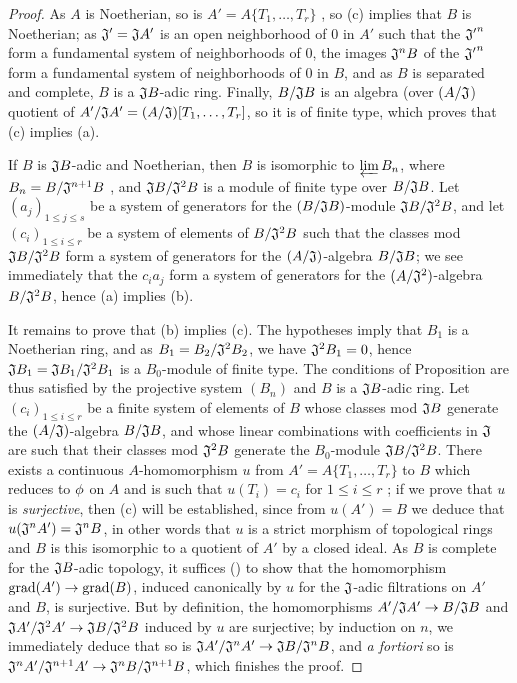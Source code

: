 \begin{proof}
\label{proof-0.7.5.5}
As $A$ is Noetherian, so is $A'=A\{T_1,\dots,T_r\}$ , so
(c) implies that $B$ is Noetherian; as $\mathfrak{J}'=\mathfrak{J}A'$ is an open neighborhood
of $0$ in $A'$ such that the ${\mathfrak{J}'}^n$ form a fundamental system of neighborhoods of
$0$, the images $\mathfrak{J}^n B$ of the ${\mathfrak{J}'}^n$ form a fundamental system of
neighborhoods of $0$ in $B$, and as $B$ is separated and complete, $B$ is a $\mathfrak{J}B$-adic
ring. Finally, $B/\mathfrak{J}B$ is an algebra (over $(A/\mathfrak{J}$) quotient of
$A'/\mathfrak{J}A'=(A/\mathfrak{J})[T_1,\dots,T_r]$, so it is of finite type, which proves that
(c) implies (a).

If $B$ is $\mathfrak{J}B$-adic and Noetherian, then $B$ is isomorphic to $\varprojlim B_n$, where
$B_n=B/\mathfrak{J}^{n+1}B$ , and $\mathfrak{J}B/\mathfrak{J}^2 B$
is a module of finite type over $B/\mathfrak{J}B$. Let $(a_j)_{1\leqslant j\leqslant s}$ be a
system of generators for the $(B/\mathfrak{J}B)$-module $\mathfrak{J}B/\mathfrak{J}^2 B$, and let
$(c_i)_{1\leqslant i\leqslant r}$ be a system of elements of $B/\mathfrak{J}^2 B$ such that the
classes
mod $\mathfrak{J}B/\mathfrak{J}^2 B$ form a system of generators for the $(A/\mathfrak{J})$-algebra
$B/\mathfrak{J}B$; we see immediately that the $c_i a_j$ form a system of generators for the
$(A/\mathfrak{J}^2)$-algebra $B/\mathfrak{J}^2 B$, hence (a) implies (b).

It remains to prove that (b) implies (c). The hypotheses imply that $B_1$ is a Noetherian ring, and
as $B_1=B_2/\mathfrak{J}^2 B_2$, we have $\mathfrak{J}^2 B_1=0$, hence
$\mathfrak{J}B_1=\mathfrak{J}B_1/\mathfrak{J}^2 B_1$ is a $B_0$-module of finite type. The
conditions of Proposition  are thus satisfied by the projective
system $(B_n)$ and $B$ is a $\mathfrak{J}B$-adic ring. Let $(c_i)_{1\leqslant i\leqslant r}$ be a
finite system of elements of $B$ whose classes mod $\mathfrak{J}B$ generate the
$(A/\mathfrak{J})$-algebra $B/\mathfrak{J}B$, and whose linear combinations with coefficients in
$\mathfrak{J}$ are such that their classes mod $\mathfrak{J}^2 B$ generate the $B_0$-module
$\mathfrak{J}B/\mathfrak{J}^2 B$. There exists a continuous $A$-homomorphism $u$ from
$A'=A\{T_1,\dots,T_r\}$ to $B$ which reduces to $\phi$ on $A$ and is such that $u(T_i)=c_i$ for
$1\leqslant i\leqslant r$ ; if we prove that $u$ is \emph{surjective},
then (c) will be established, since from $u(A')=B$ we deduce that
$u(\mathfrak{J}^n A')=\mathfrak{J}^n B$, in other words that $u$ is a strict morphism of topological
rings and $B$ is this isomorphic to a quotient of $A'$ by a closed ideal. As $B$ is complete for the
$\mathfrak{J}B$-adic topology, it suffices (\cite[p.~18--07]{I-1}) to show that the homomorphism
${\mathop{\mathrm{grad}}\nolimits}(A')\to{\mathop{\mathrm{grad}}\nolimits}(B)$, induced canonically by $u$ for the $\mathfrak{J}$-adic filtrations on
$A'$ and $B$, is surjective. But by definition, the homomorphisms
$A'/\mathfrak{J}A'\to B/\mathfrak{J}B$ and
$\mathfrak{J}A'/\mathfrak{J}^2 A'\to\mathfrak{J}B/\mathfrak{J}^2 B$ induced by $u$ are surjective;
by induction on $n$, we immediately deduce that so is
$\mathfrak{J}A'/\mathfrak{J}^n A'\to\mathfrak{J}B/\mathfrak{J}^n B$, and \emph{a fortiori} so is
$\mathfrak{J}^n A'/\mathfrak{J}^{n+1}A'\to\mathfrak{J}^n B/\mathfrak{J}^{n+1}B$, which finishes the
proof.
\end{proof}

